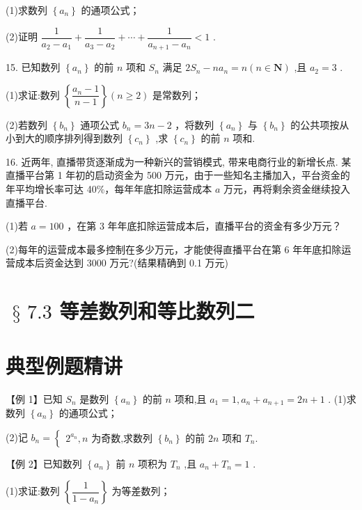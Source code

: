 (1)求数列 $\left\{  {a}_{n}\right\}$ 的通项公式；

(2)证明 $\dfrac{1}{{a}_{2} - {a}_{1}} + \dfrac{1}{{a}_{3} - {a}_{2}} + \cdots  + \dfrac{1}{{a}_{n + 1} - {a}_{n}} < 1$ .

15. 已知数列 $\left\{  {a}_{n}\right\}$ 的前 $n$ 项和 ${S}_{n}$ 满足 $2{S}_{n} - n{a}_{n} = n\left( {n \in  \mathbf{N}}\right)$ ,且 ${a}_{2} = 3$ .

(1)求证:数列 $\left\{  \dfrac{{a}_{n} - 1}{n - 1}\right\}  \left( {n \geq  2}\right)$ 是常数列；

(2)若数列 $\left\{  {b}_{n}\right\}$ 通项公式 ${b}_{n} = {3n} - 2$ ，将数列 $\left\{  {a}_{n}\right\}$ 与 $\left\{  {b}_{n}\right\}$ 的公共项按从小到大的顺序排列得到数列 $\left\{  {c}_{n}\right\}$ ,求 $\left\{  {c}_{n}\right\}$ 的前 $n$ 项和.

16. 近两年, 直播带货逐渐成为一种新兴的营销模式, 带来电商行业的新增长点. 某直播平台第 1 年初的启动资金为 500 万元，由于一些知名主播加入，平台资金的年平均增长率可达 40\%，每年年底扣除运营成本 $a$ 万元，再将剩余资金继续投入直播平台.

(1)若 $a = {100}$ ，在第 3 年年底扣除运营成本后，直播平台的资金有多少万元？

(2)每年的运营成本最多控制在多少万元，才能使得直播平台在第 6 年年底扣除运营成本后资金达到 3000 万元?(结果精确到 0.1 万元)

\section*{$\text{ § }{7.3}$ 等差数列和等比数列二}

\section*{典型例题精讲}

【例 1】已知 ${S}_{n}$ 是数列 $\left\{  {a}_{n}\right\}$ 的前 $n$ 项和,且 ${a}_{1} = 1,{a}_{n} + {a}_{n + 1} = {2n} + 1$ . (1)求数列 $\left\{  {a}_{n}\right\}$ 的通项公式；

(2)记 ${b}_{n} = \left\{  \begin{array}{l} {2}^{{a}_{n}},n\text{ 为奇数,求数列 }\left\{  {b}_{n}\right\}  \text{ 的前 }{2n}\text{ 项和 }{T}_{n}. \end{array}\right.$

【例 2】已知数列 $\left\{  {a}_{n}\right\}$ 前 $n$ 项积为 ${T}_{n}$ ,且 ${a}_{n} + {T}_{n} = 1$ .

(1)求证:数列 $\left\{  \dfrac{1}{1 - {a}_{n}}\right\}$ 为等差数列；

